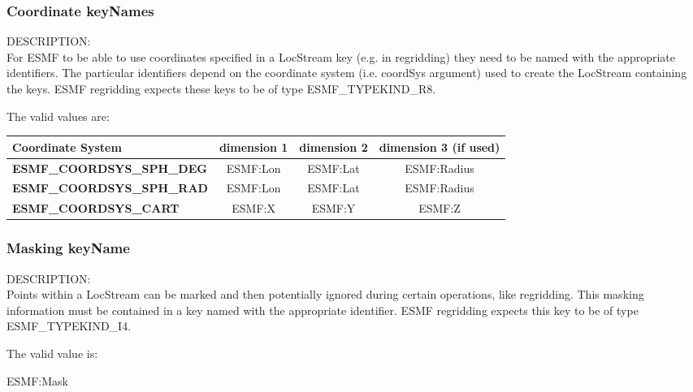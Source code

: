 

\subsubsection{Coordinate keyNames}
\label{const:coordkeyname}

{\sf DESCRIPTION:\\}
For ESMF to be able to use coordinates specified in a LocStream key (e.g. in regridding) 
they need to be named with the appropriate identifiers. The particular identifiers depend 
on the coordinate system (i.e. coordSys argument) used to create the LocStream containing 
the keys.  ESMF regridding expects these keys to be of type ESMF\_TYPEKIND\_R8. 

The valid values are:
\newline
\begin{tabular}{|l|c|c|c||}
\hline
\hline
Coordinate System & {\bf dimension 1}  & {\bf dimension 2} & {\bf dimension 3 (if used)} \\
\hline
{\bf ESMF\_COORDSYS\_SPH\_DEG}  & ESMF:Lon & ESMF:Lat & ESMF:Radius \\
{\bf ESMF\_COORDSYS\_SPH\_RAD}  & ESMF:Lon & ESMF:Lat & ESMF:Radius \\
{\bf ESMF\_COORDSYS\_CART}  & ESMF:X & ESMF:Y & ESMF:Z \\
\hline
\hline
\end{tabular}


\subsubsection{Masking keyName}
\label{const:maskkeyname}

{\sf DESCRIPTION:\\}
Points within a LocStream can be marked and then potentially ignored during certain 
operations, like regridding.  This masking information must be contained in a key 
named with the appropriate identifier.  ESMF regridding expects this key to be 
of type ESMF\_TYPEKIND\_I4.

The valid value is:
\begin{description}
\item [ESMF:Mask] 
\end{description}
